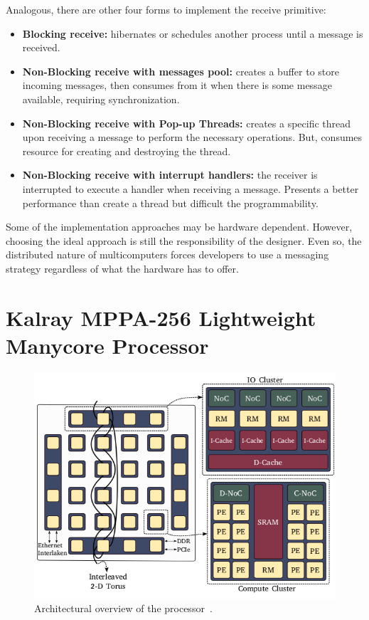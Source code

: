 				Analogous, there are other four forms to implement the receive primitive:
				\begin{itemize}
					\item \textbf{Blocking receive:} \cpu hibernates or schedules another
						process until a message is received.
					\item \textbf{Non-Blocking receive with messages pool:} \cpu creates
						a buffer to store incoming messages, then consumes from it when
						there is some message available, requiring synchronization.
					\item \textbf{Non-Blocking receive with Pop-up Threads:} creates a specific
						thread upon receiving a message to perform the necessary operations.
						But, consumes resource for creating and destroying the thread.
					\item \textbf{Non-Blocking receive with interrupt handlers:} the receiver
						is interrupted to execute a handler when receiving a message.
						Presents a better performance than create a thread but difficult
						the programmability.
				\end{itemize}

				Some of the implementation approaches may be hardware dependent.
				However, choosing the ideal approach is still the responsibility of the \os designer.
				Even so, the distributed nature of multicomputers forces developers to
				use a messaging strategy regardless of what the hardware has to offer.
	
	\section{Kalray MPPA-256 Lightweight Manycore Processor}
	\label{sec.mppa}

		\begin{figure}[h]
			\centering
			\includegraphics[width=.7\textwidth]{images/arch-mppa.png}

			\caption{
				Architectural overview of the \mppa processor~\cite{Penna2018}.
			}\par
			\label{fig.mppa-arch}
		\end{figure}

